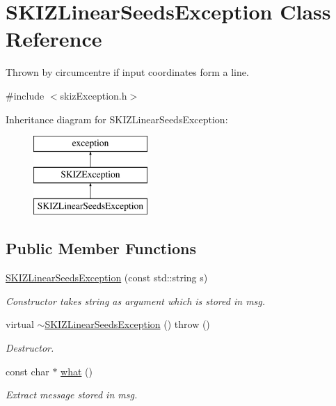 \hypertarget{classSKIZLinearSeedsException}{}\section{S\+K\+I\+Z\+Linear\+Seeds\+Exception Class Reference}
\label{classSKIZLinearSeedsException}


Thrown by circumcentre if input coordinates form a line.  




{\ttfamily \#include $<$skiz\+Exception.\+h$>$}

Inheritance diagram for S\+K\+I\+Z\+Linear\+Seeds\+Exception\+:\begin{figure}[H]
\begin{center}
\leavevmode
\includegraphics[height=3.000000cm]{classSKIZLinearSeedsException}
\end{center}
\end{figure}
\subsection*{Public Member Functions}
\begin{DoxyCompactItemize}
\item 
\mbox{\label{classSKIZLinearSeedsException_a11607556ca04d52a2d2c35c06fad3f6b}} 
\mbox{\hyperlink{classSKIZLinearSeedsException_a11607556ca04d52a2d2c35c06fad3f6b}{S\+K\+I\+Z\+Linear\+Seeds\+Exception}} (const std\+::string s)
\begin{DoxyCompactList}\small\item\em Constructor takes string as argument which is stored in msg. \end{DoxyCompactList}\item 
\mbox{\label{classSKIZLinearSeedsException_a8482d8d51517e183205757fd4855107b}} 
virtual \mbox{\hyperlink{classSKIZLinearSeedsException_a8482d8d51517e183205757fd4855107b}{$\sim$\+S\+K\+I\+Z\+Linear\+Seeds\+Exception}} ()  throw ()
\begin{DoxyCompactList}\small\item\em Destructor. \end{DoxyCompactList}\item 
\mbox{\label{classSKIZLinearSeedsException_a4d187b93ce4261b7303ab75e23e06e30}} 
const char $\ast$ \mbox{\hyperlink{classSKIZLinearSeedsException_a4d187b93ce4261b7303ab75e23e06e30}{what}} ()
\begin{DoxyCompactList}\small\item\em Extract message stored in msg. \end{DoxyCompactList}\end{DoxyCompactItemize}


